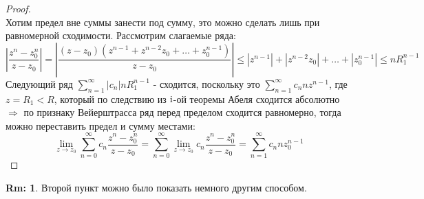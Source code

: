 \documentclass[12pt]{article}
\newcommand{\RN}[1]{%
	\textup{\uppercase\expandafter{\romannumeral#1}}%
}
\theoremstyle{definition}
\newtheorem{rem}{Rm:}
\newcommand{\ddsum}[2]{\displaystyle\sum\limits_{#1}^{#2}}
\begin{document}
\begin{proof}
$$	$$
	Хотим предел вне суммы занести под сумму, это можно сделать лишь при равномерной сходимости. Рассмотрим слагаемые ряда:
	$$
		\left| \dfrac{z^n - z_0^n}{z - z_0} \right| = \left|\dfrac{(z - z_0)(z^{n-1} + z^{n-2}z_0 + \dotsc + z_0^{n-1})}{z - z_0} \right| \leq |z^{n-1}| + |z^{n-2}z_0| + \dotsc + |z_0^{n-1}| \leq nR_1^{n-1}
	$$
	Следующий ряд $\ddsum{n = 1}{\infty}|c_n|nR_1^{n-1}$ - сходится, поскольку это $\ddsum{n = 1}{\infty}c_n n z^{n-1}$, где $z = R_1 < R$, который по следствию из $\RN{1}$-ой теоремы Абеля сходится абсолютно $\Rightarrow$ по признаку Вейерштрасса ряд перед пределом сходится равномерно, тогда можно переставить предел и сумму местами:
	$$
		\lim\limits_{z \to z_0}\ddsum{n = 0}{\infty}c_n\dfrac{z^n - z_0^n}{z - z_0} = \ddsum{n = 0}{\infty} 	\lim\limits_{z \to z_0}c_n\dfrac{z^n - z_0^n}{z - z_0} = \ddsum{n = 1}{\infty}c_n n z_0^{n-1}
 	$$
\end{proof}
\begin{rem}
	Второй пункт можно было показать немного другим способом.
\end{rem}
\end{document}

